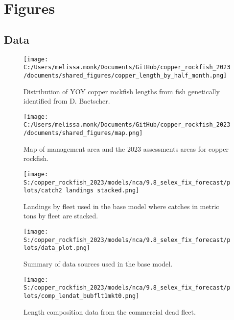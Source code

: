 \documentclass[11pt,
  english,
  letterpaper,
]{article}
\begin{document}
\newpage

\clearpage

\hypertarget{figures}{%
\section{Figures}\label{figures}}

\hypertarget{data}{%
\subsection{Data}\label{data}}

\begin{figure}
\centering
\texttt{[image: C:/Users/melissa.monk/Documents/GitHub/copper\_rockfish\_2023/documents/shared\_figures/copper\_length\_by\_half\_month.png]}
\caption{Distribution of YOY copper rockfish lengths from fish genetically identified from D. Baetscher.\label{fig:copper-smurf-length}}
\end{figure}

\pagebreak

\begin{figure}
\centering
\texttt{[image: C:/Users/melissa.monk/Documents/GitHub/copper\_rockfish\_2023/documents/shared\_figures/map.png]}
\caption{Map of management area and the 2023 assessments areas for copper rockfish.\label{fig:ca-map}}
\end{figure}

\pagebreak

\begin{figure}
\centering
\texttt{[image: S:/copper\_rockfish\_2023/models/nca/9.8\_selex\_fix\_forecast/plots/catch2 landings stacked.png]}
\caption{Landings by fleet used in the base model where catches in metric tons by fleet are stacked.\label{fig:catch}}
\end{figure}

\pagebreak

\begin{figure}
\centering
\texttt{[image: S:/copper\_rockfish\_2023/models/nca/9.8\_selex\_fix\_forecast/plots/data\_plot.png]}
\caption{Summary of data sources used in the base model.\label{fig:data-plot}}
\end{figure}

\pagebreak

\begin{figure}
\centering
\texttt{[image: S:/copper\_rockfish\_2023/models/nca/9.8\_selex\_fix\_forecast/plots/comp\_lendat\_bubflt1mkt0.png]}
\caption{Length composition data from the commercial dead fleet.\label{fig:com-dead-len-data}}
\end{figure}
\end{document}
